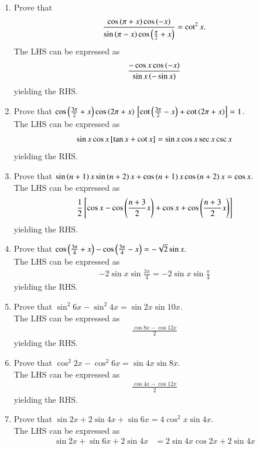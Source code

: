 \begin{enumerate}[label=\thesubsection.\arabic*,ref=\thesubsection.\theenumi,itemsep=1ex]
\item Prove that
$$\frac{\cos\left(\pi+x\right)\cos\left(-x\right)}{\sin\left(\pi-x\right)\cos\left(\frac{\pi}{2}+x\right)}=\cot^{2}x.$$
%
\solution
The LHS can be expressed as
\begin{align}
	\frac{-\cos x\cos\left(-x\right)}{\sin x\left(-\sin x\right)}
\end{align}
yielding the RHS.
\item Prove that
$\cos\left(\frac{3\pi}{2}+x\right)\cos\left(2\pi+x\right){}\left[\cot\left(\frac{3\pi}{2}-x\right)+\cot\left(2\pi +x\right)\right]=1$.
%
\\
\solution The LHS can be expressed as 
\begin{align}
	\sin x\cos x{}\left[\tan x+\cot x\right]=
\sin x\cos x\sec x\csc x
\end{align}
yielding the RHS.
\item Prove that
$\sin\left(n+1\right)x\sin\left(n+2\right)x+\cos\left(n+1\right)x\cos\left(n+2\right)x=\cos x.$
%
\\
\solution The LHS can be expressed as
\begin{align}
	\frac{1}{2}{}\left[\cos x - \cos\left(\frac{n+3}{2}x\right)+\cos x+\cos\left(\frac{n+3}{2}x\right)\right]
\end{align}
yielding the RHS.
\item Prove that
$\cos\left(\frac{3\pi}{4}+x\right)-\cos\left(\frac{3\pi}{4}-x\right)=-\sqrt 2\sin x.$
%
\\
\solution  The LHS can be expressed as 
\begin{align}
-2\sin x \sin \frac{3\pi}{4}
=-2\sin x \sin \frac{\pi}{4}
\end{align}
yielding the RHS.
\item Prove that
$\sin^{2}6x-\sin^{2}4x=\sin2x\sin10x.$
%
\\
\solution  The LHS can be expressed as 
\begin{align}
	\frac{\cos 8x - \cos 12 x }{2}
\end{align}
yielding the RHS.
\item Prove that
$\cos^{2}2x-\cos^{2}6x=\sin4x\sin8x.$
%
\\
\solution  The LHS can be expressed as 
\begin{align}
	\frac{\cos 4x - \cos 12 x }{2}
\end{align}
yielding the RHS.
\item Prove that
$\sin2x+2\sin4x+\sin6x=4\cos^{2}x\sin4x.$
%
\\
\solution  The LHS can be expressed as 
\begin{align}
	\sin2x+\sin6x+2\sin4x&=2\sin4x\cos 2x + 2\sin 4x
	\\

\end{align}
\end{enumerate}
